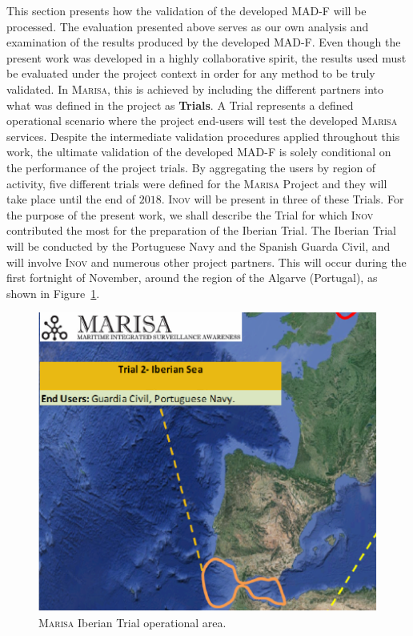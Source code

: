 This section presents how the validation of the developed MAD-F will be processed. The evaluation presented above serves as our own analysis and examination of the results produced by the developed MAD-F. Even though the present work was developed in a highly collaborative spirit, the results used must be evaluated under the project context in order for any method to be truly validated. In \textsc{Marisa}, this is achieved by including the different partners into what was defined in the project as \textbf{Trials}. A Trial represents a defined operational scenario where the project end-users will test the developed \textsc{Marisa} services. Despite the intermediate validation procedures applied throughout this work, the ultimate validation of the developed MAD-F is solely conditional on the performance 
of the project trials. By aggregating the users by region of activity, five different trials were defined for the \textsc{Marisa} Project and they will take place until the end of $2018$. \textsc{Inov} will be present in three of these Trials. For 
the purpose of the present work, we shall describe the Trial for which \textsc{Inov} contributed the most for the preparation of the Iberian Trial. The Iberian Trial will be conducted by the Portuguese Navy and the Spanish Guarda Civil, and will involve \textsc{Inov} and numerous other project partners. This will occur during the first fortnight of November, around the region of the Algarve (Portugal), as shown in Figure~\ref{fig: 5 TrialArea}.  

\begin{figure}[H]
	\centering
	\includegraphics[scale=1.4]{figures/Ch5/IberainTrial.pdf}
    \caption{\textsc{Marisa} Iberian Trial operational area.}
    \label{fig: 5 TrialArea}
\end{figure}

